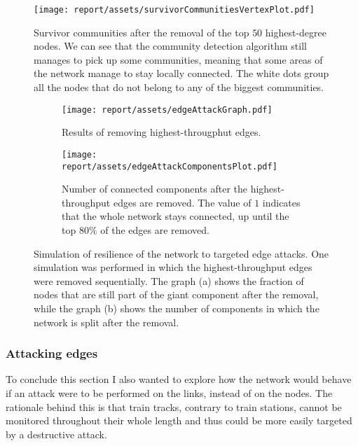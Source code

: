 \begin{figure}[h]
    \centering
    \texttt{[image: report/assets/survivorCommunitiesVertexPlot.pdf]}
    \caption{Survivor communities after the removal of the top $50$ highest-degree nodes. We can see that the community detection algorithm still manages to pick up some communities, meaning that some areas of the network manage to stay locally connected. The white dots group all the nodes that do not belong to any of the biggest communities.}
    \label{fig:survivor-communities}
\end{figure}


\begin{figure}[h!]
    \centering
    \begin{subfigure}[h]{\linewidth}
        \centering  
        \texttt{[image: report/assets/edgeAttackGraph.pdf]}
        \caption{Results of removing highest-througphut edges.}
        \label{fig:edge-attack-graph}
    \end{subfigure}
    \hfill
    \begin{subfigure}[h]{\linewidth}
        \centering
        \texttt{[image: report/assets/edgeAttackComponentsPlot.pdf]}
        \caption{Number of connected components after the highest-throughput edges are removed. The value of $1$ indicates that the whole network stays connected, up until the top $80\%$ of the edges are removed.}
        \label{fig:edge-attack-components}
    \end{subfigure}
    \caption{Simulation of resilience of the network to targeted edge attacks. One simulation was performed in which the highest-throughput edges were removed sequentially. The graph (a) shows the fraction of nodes that are still part of the giant component after the removal, while the graph (b) shows the number of components in which the network is split after the removal.}
    \label{fig:edge-attack}
\end{figure}


\subsubsection{Attacking edges}
To conclude this section I also wanted to explore how the network would behave if an attack were to be performed on the links, instead of on the nodes.
The rationale behind this is that train tracks, contrary to train stations, cannot be monitored throughout their whole length and thus could be more easily targeted by a destructive attack\footnotemark.

